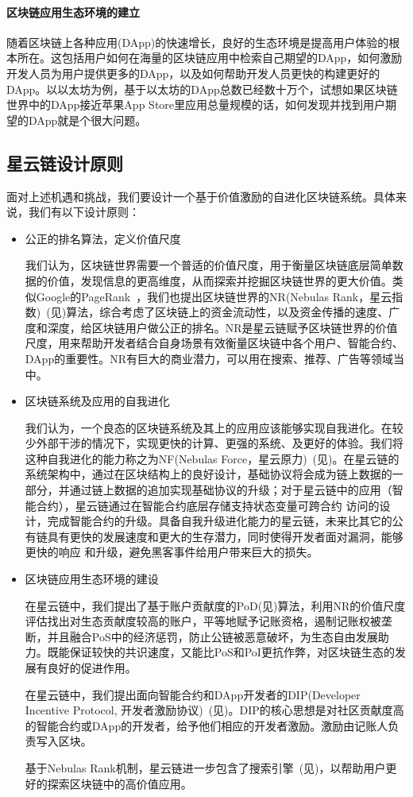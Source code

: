 \paragraph{区块链应用生态环境的建立}随着区块链上各种应用(DApp)的快速增长，良好的生态环境是提高用户体验的根本所在。这包括用户如何在海量的区块链应用中检索自己期望的DApp，如何激励开发人员为用户提供更多的DApp，以及如何帮助开发人员更快的构建更好的DApp。以以太坊为例，基于以太坊的DApp总数已经数十万个，试想如果区块链世界中的DApp接近苹果App Store里应用总量规模的话，如何发现并找到用户期望的DApp就是个很大问题。


\subsection{星云链设计原则}
面对上述机遇和挑战，我们要设计一个基于价值激励的自进化区块链系统。具体来说，我们有以下设计原则：
\begin{itemize}
	\item 公正的排名算法，定义价值尺度

我们认为，区块链世界需要一个普适的价值尺度，用于衡量区块链底层简单数据的价值，发现信息的更高维度，从而探索并挖掘区块链世界的更大价值。类似Google的PageRank~\cite{Brin2010}\cite{page1999pagerank}，我们也提出区块链世界的NR(Nebulas Rank，星云指数)~(见)算法，综合考虑了区块链上的资金流动性，以及资金传播的速度、广度和深度，给区块链用户做公正的排名。NR是星云链赋予区块链世界的价值尺度，用来帮助开发者结合自身场景有效衡量区块链中各个用户、智能合约、DApp的重要性。NR有巨大的商业潜力，可以用在搜索、推荐、广告等领域当中。

  \item 区块链系统及应用的自我进化

    我们认为，一个良态的区块链系统及其上的应用应该能够实现自我进化。在较少外部干涉的情况下，实现更快的计算、更强的系统、及更好的体验。我们将这种自我进化的能力称之为NF(Nebulas Force，星云原力)~(见)。在星云链的系统架构中，通过在区块结构上的良好设计，基础协议将会成为链上数据的一部分，并通过链上数据的追加实现基础协议的升级；对于星云链中的应用（智能合约），星云链通过在智能合约底层存储支持状态变量可跨合约
    访问的设计，完成智能合约的升级。具备自我升级进化能力的星云链，未来比其它的公有链具有更快的发展速度和更大的生存潜力，同时使得开发者面对漏洞，能够更快的响应 和升级，避免黑客事件给用户带来巨大的损失。

\item 区块链应用生态环境的建设

在星云链中，我们提出了基于账户贡献度的PoD(见)算法，利用NR的价值尺度评估找出对生态贡献度较高的账户，平等地赋予记账资格，遏制记账权被垄断，并且融合PoS中的经济惩罚，防止公链被恶意破坏，为生态自由发展助力。既能保证较快的共识速度，又能比PoS和PoI更抗作弊，对区块链生态的发展有良好的促进作用。


在星云链中，我们提出面向智能合约和DApp开发者的DIP(Developer Incentive Protocol, 开发者激励协议)~(见)。DIP的核心思想是对社区贡献度高的智能合约或DApp的开发者，给予他们相应的开发者激励。激励由记账人负责写入区块。

基于Nebulas Rank机制，星云链进一步包含了搜索引擎~(见)，以帮助用户更好的探索区块链中的高价值应用。

\end{itemize}


